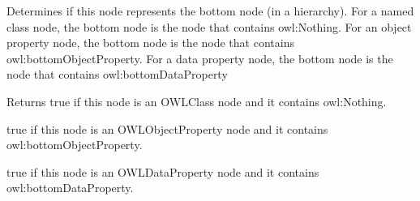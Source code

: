 Determines if this node represents the bottom node (in a hierarchy). For a named class node, the bottom node is the node that contains {\ttfamily owl\-:Nothing}. For an object property node, the bottom node is the node that contains {\ttfamily owl\-:bottom\-Object\-Property}. For a data property node, the bottom node is the node that contains {\ttfamily owl\-:bottom\-Data\-Property} \begin{DoxyReturn}{Returns}
{\ttfamily true} if this node is an {\ttfamily O\-W\-L\-Class} node and it contains {\ttfamily owl\-:Nothing}. 
\end{DoxyReturn}
{\ttfamily true} if this node is an {\ttfamily O\-W\-L\-Object\-Property} node and it contains {\ttfamily owl\-:bottom\-Object\-Property}. 

{\ttfamily true} if this node is an {\ttfamily O\-W\-L\-Data\-Property} node and it contains {\ttfamily owl\-:bottom\-Data\-Property}. 

